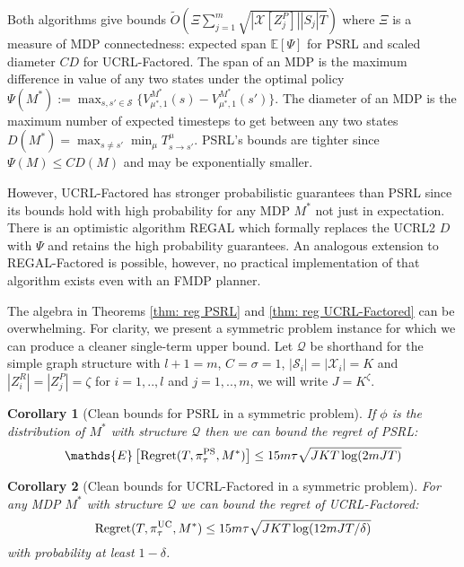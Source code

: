 \documentclass{article}
\newtheorem{corollary}{Corollary}
\newcommand{\Exp}{\mathds{E}}
\newcommand{\Xc}{\mathcal{X}}
\newcommand{\Qc}{\mathcal{Q}}
\newcommand{\Sc}{\mathcal{S}}
\begin{document}
Both algorithms give bounds $\tilde{O}\left(\Xi \sum_{j=1}^m \sqrt{|\Xc[Z_j^P]| |S_j| T}\right)$ where $\Xi$ is a measure of MDP connectedness: expected span $\Exp[\Psi]$ for PSRL and scaled diameter $CD$ for UCRL-Factored.
The span of an MDP is the maximum difference in value of any two states under the optimal policy $\Psi(M^*) := \max_{s,s' \in \Sc} \{V^{M^*}_{\mu^*,1}(s) - V^{M^*}_{\mu^*,1}(s')\}$.
The diameter of an MDP is the maximum number of expected timesteps to get between any two states $D(M^*) = \max_{s \neq s'}\min_\mu T^\mu_{s \rightarrow s'}$.
PSRL's bounds are tighter since $\Psi(M) \le C D(M)$ and may be exponentially smaller.

However, UCRL-Factored has stronger probabilistic guarantees than PSRL since its bounds hold with high probability for any MDP $M^*$ not just in expectation.
There is an optimistic algorithm REGAL \cite{bartlett2009regal} which formally replaces the UCRL2 $D$ with $\Psi$ and retains the high probability guarantees.
An analogous extension to REGAL-Factored is possible, however, no practical implementation of that algorithm exists even with an FMDP planner.

The algebra in Theorems \ref{thm: reg PSRL} and \ref{thm: reg UCRL-Factored} can be overwhelming.
For clarity, we present a symmetric problem instance for which we can produce a cleaner single-term upper bound.
Let $\Qc$ be shorthand for the simple graph structure with $l+1=m$, $C=\sigma=1$, $| \Sc_i | = |\Xc_i | = K$ and $|Z^R_i| = |Z^P_j| = \zeta$ for $i=1,..,l$ and $j=1,..,m$, we will write $J = K^\zeta$.

\begin{corollary}[Clean bounds for PSRL in a symmetric problem]
\label{cor: reg PSRL}  \hspace{0.000000001mm} \newline
If $\phi$ is the distribution of $M^*$ with structure $\Qc$ then we can bound the regret of PSRL:
\begin{equation}
	\Exp \left[\mathrm{Regret}(T, \pi^{\rm PS}_{\tau}, M^*) \right]
	\le 15m \tau \sqrt{J K T \log(2mJ T)}
\end{equation}
\end{corollary}

\begin{corollary}[Clean bounds for UCRL-Factored in a symmetric problem]
\label{cor: reg UCRL-Factored}  \hspace{0.000000001mm} \newline
For any MDP $M^*$ with structure $\Qc$ we can bound the regret of UCRL-Factored:
\begin{equation}
	\mathrm{Regret}(T, \pi^{\rm UC}_{\tau}, M^*) \le  15m \tau \sqrt{J K T \log(12mJT / \delta)}
\end{equation}
with probability at least $1-\delta$.
\end{corollary}
\end{document}
